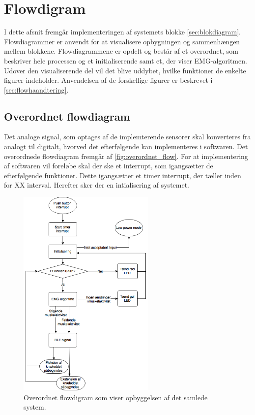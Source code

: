 \section{Flowdigram}
I dette afsnit fremgår implementeringen af systemets blokke \autoref{sec:blokdiagram}. Flowdiagrammer er anvendt for at visualisere opbygningen og sammenhængen mellem blokkene. Flowdiagrammene er opdelt og består af et overordnet, som beskriver hele processen og et initialiserende samt et, der viser EMG-algoritmen. Udover den visualiserende del vil det blive uddybet, hvilke funktioner de enkelte figurer indeholder. Anvendelsen af de forskellige figurer er beskrevet i \autoref{sec:flowhaandtering}.

\subsection{Overordnet flowdiagram}
Det analoge signal, som optages af de implemterende sensorer skal konverteres fra analogt til digitalt, hvorved det efterfølgende kan implementeres i softwaren. Det overordnede flowdiagram fremgår af \autoref{fig:overordnet_flow}. For at implementering af softwaren vil foreløbe skal der ske et interrupt, som igangsætter de efterfølgende funktioner. Dette igangsætter et timer interrupt, der tæller inden for XX interval. Herefter sker der en intialisering af systemet.

\begin{figure}[H]
\centering
\includegraphics[width=0.6\textwidth]{figures/implementering/overordnet_flow}
\caption{Overordnet flowdigram som viser opbyggelsen af det samlede system.}
\label{fig:overordnet_flow}
\end{figure}


